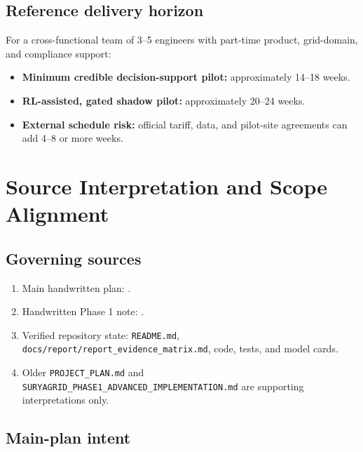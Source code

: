 \documentclass[11pt,a4paper]{article}
\newcommand{\code}[1]{\texttt{\small #1}}
\begin{document}
\subsection{Reference delivery horizon}

For a cross-functional team of 3--5 engineers with part-time product, grid-domain, and
compliance support:

\begin{itemize}
  \item \textbf{Minimum credible decision-support pilot:} approximately 14--18 weeks.
  \item \textbf{RL-assisted, gated shadow pilot:} approximately 20--24 weeks.
  \item \textbf{External schedule risk:} official tariff, data, and pilot-site agreements can
        add 4--8 or more weeks.
\end{itemize}

\section{Source Interpretation and Scope Alignment}

\subsection{Governing sources}

\begin{enumerate}
  \item Main handwritten plan:
  .
  \item Handwritten Phase 1 note:
  .
  \item Verified repository state: \code{README.md},
  \code{docs/report/report_evidence_matrix.md}, code, tests, and model cards.
  \item Older \code{PROJECT_PLAN.md} and
  \code{SURYAGRID_PHASE1_ADVANCED_IMPLEMENTATION.md} are supporting interpretations only.
\end{enumerate}

\subsection{Main-plan intent}
\end{document}
